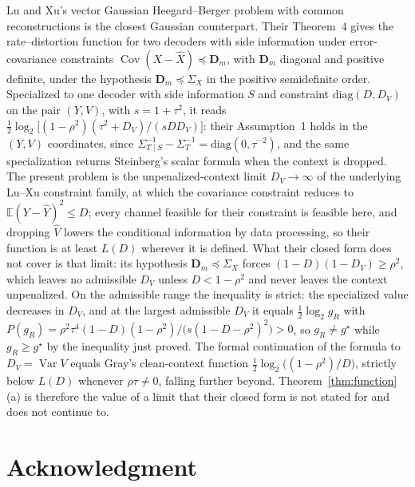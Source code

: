 \documentclass[11pt,onecolumn]{IEEEtran}
\newcommand{\E}{\mathbb{E}}
\newcommand{\Cov}{\operatorname{Cov}}
\newcommand{\hX}{\widehat{X}}
\newcommand{\hY}{\widehat{Y}}
\begin{document}
Lu and Xu's vector Gaussian Heegard--Berger problem with common
reconstructions \cite{luxu2021} is the closest Gaussian counterpart. Their Theorem~4 gives the rate--distortion function
for two decoders with side information under error-covariance
constraints $\Cov(X-\hX)\preceq\mathbf D_m$, with $\mathbf D_m$ diagonal
and positive definite, under the hypothesis $\mathbf D_m\preceq\Sigma_X$
in the positive semidefinite order. Specialized to one decoder with side
information $S$ and constraint $\mathrm{diag}(D,D_V)$ on the pair
$(Y,V)$, with $s=1+\tau^2$, it reads
$\tfrac12\log_2\bigl[(1-\rho^2)(\tau^2+D_V)/(sDD_V)\bigr]$: their
Assumption~1 holds in the $(Y,V)$ coordinates, since
$\Sigma_{T\mid S}^{-1}-\Sigma_T^{-1}=\mathrm{diag}(0,\tau^{-2})$, and the
same specialization returns Steinberg's scalar formula when the context
is dropped. The present problem is the unpenalized-context limit $D_V\to\infty$ of
the underlying Lu--Xu constraint family,
at which the covariance constraint reduces to $\E(Y-\hY)^2\le D$; every
channel feasible for their constraint is feasible here, and dropping
$\hat V$ lowers the conditional information by data processing, so
their function is at least $L(D)$ wherever it is defined. What their
closed form does not cover is that limit: its hypothesis
$\mathbf D_m\preceq\Sigma_X$ forces $(1-D)(1-D_V)\ge\rho^2$, which leaves
no admissible $D_V$ unless $D<1-\rho^2$ and never leaves the context
unpenalized. On the admissible range the inequality is strict: the specialized
value decreases in $D_V$, and at the largest admissible $D_V$ it equals
$\tfrac12\log_2g_R$ with
$P(g_R)=\rho^2\tau^4(1-D)(1-\rho^2)/\bigl(s(1-D-\rho^2)^2\bigr)>0$, so
$g_R\ne g^\star$ while $g_R\ge g^\star$ by the inequality just proved.
The formal continuation of the formula to $D_V=\operatorname{Var}V$
equals Gray's clean-context function
$\tfrac12\log_2\bigl((1-\rho^2)/D\bigr)$, strictly below $L(D)$ whenever
$\rho\tau\ne0$, falling further beyond. Theorem~\ref{thm:function}(a)
is therefore the value of a limit that their closed form is not stated
for and does not continue to.

\section*{Acknowledgment}
\end{document}
